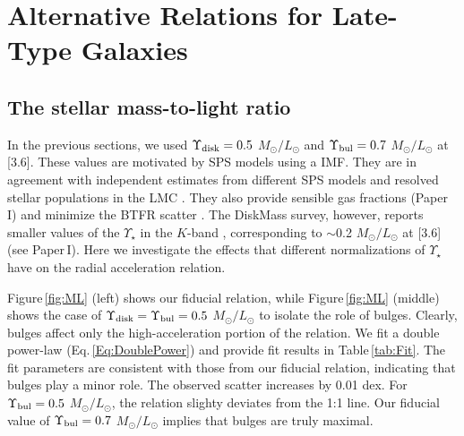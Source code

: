 \documentclass[apjl, twocolappendix]{emulateapj}
\begin{document}
\section{Alternative Relations for Late-Type Galaxies}

\subsection{The stellar mass-to-light ratio}\label{sec:ML}

In the previous sections, we used $\Upsilon_{\rm disk} = 0.5$ $M_{\odot}/L_{\odot}$ and $\Upsilon_{\rm bul} = 0.7$ $M_{\odot}/L_{\odot}$ at [3.6]. These values are motivated by SPS models \citep{Schombert2014a} using a \citet{Chabrier2003} IMF. They are in agreement with independent estimates from different SPS models \citep{Meidt2014, Norris2016} and resolved stellar populations in the LMC \citep{Eskew2012}. They also provide sensible gas fractions (Paper\,I) and minimize the BTFR scatter \citep{Lelli2016}. The DiskMass survey, however, reports smaller values of the $\Upsilon_{\star}$ in the $K$-band \citep{Martinsson2013, Swaters2014}, corresponding to $\sim$0.2 $M_{\odot}/L_{\odot}$ at [3.6] (see Paper\,I). Here we investigate the effects that different normalizations of $\Upsilon_{\star}$ have on the radial acceleration relation.

Figure\,\ref{fig:ML} (left) shows our fiducial relation, while Figure\,\ref{fig:ML} (middle) shows the case of $\Upsilon_{\rm disk} = \Upsilon_{\rm bul} = 0.5$ $M_{\odot}/L_{\odot}$ to isolate the role of bulges. Clearly, bulges affect only the high-acceleration portion of the relation. We fit a double power-law (Eq.\,\ref{Eq:DoublePower}) and provide fit results in Table\,\ref{tab:Fit}. The fit parameters are consistent with those from our fiducial relation, indicating that bulges play a minor role. The observed scatter increases by 0.01 dex. For $\Upsilon_{\rm bul} = 0.5$ $M_{\odot}/L_{\odot}$, the relation slighty deviates from the 1:1 line. Our fiducial value of $\Upsilon_{\rm bul} = 0.7$ $M_{\odot}/L_{\odot}$ implies that bulges are truly maximal.
\end{document}

